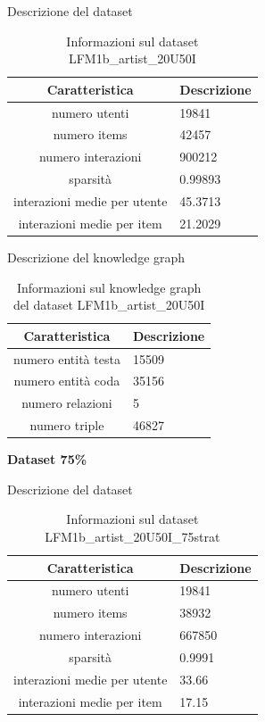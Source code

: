 \noindent Descrizione del dataset
\begin{table}[H]
    \centering
    \footnotesize
    \begin{tabularx}{\textwidth}{|c|X|}
        \hline
        \textbf{Caratteristica} & \textbf{Descrizione} \\
        \hline
        numero utenti & 19841 \\
        \hline
        numero items & 42457 \\
        \hline
        numero interazioni & 900212 \\
        \hline
        sparsità & 0.99893 \\
        \hline
        interazioni medie per utente & 45.3713 \\
        \hline
        interazioni medie per item & 21.2029 \\
        \hline
    \end{tabularx}
    \caption{Informazioni sul dataset LFM1b\_artist\_20U50I}
    \label{tab:dataset_info}
\end{table}


\noindent Descrizione del knowledge graph
\begin{table}[H]
    \centering
    \footnotesize
    \begin{tabularx}{\textwidth}{|c|X|}
        \hline
        \textbf{Caratteristica} & \textbf{Descrizione} \\
        \hline
        numero entità testa & 15509 \\
        \hline
        numero entità coda & 35156 \\
        \hline
        numero relazioni & 5 \\
        \hline
        numero triple & 46827 \\
        \hline
    \end{tabularx}
    \caption{Informazioni sul knowledge graph del dataset LFM1b\_artist\_20U50I}
    \label{tab:dataset_info}
\end{table}

\noindent\textbf{Dataset 75\%}

\noindent Descrizione del dataset
\begin{table}[H]
    \centering
    \footnotesize
    \begin{tabularx}{\textwidth}{|c|X|}
        \hline
        \textbf{Caratteristica} & \textbf{Descrizione} \\
        \hline
        numero utenti & 19841 \\
        \hline
        numero items & 38932 \\
        \hline
        numero interazioni & 667850 \\
        \hline
        sparsità & 0.9991 \\
        \hline
        interazioni medie per utente & 33.66\\
        \hline
        interazioni medie per item & 17.15 \\
        \hline
    \end{tabularx}
    \caption{Informazioni sul dataset LFM1b\_artist\_20U50I\_75strat}
    \label{tab:dataset_info}
\end{table}


